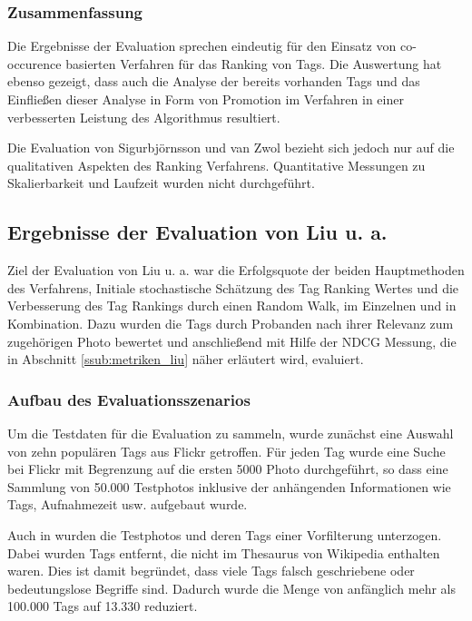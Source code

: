 
\subsubsection*{Zusammenfassung} %
\label{ssub:zusammenfassung}
Die Ergebnisse der Evaluation sprechen eindeutig für den Einsatz von co-occurence basierten Verfahren für das Ranking von Tags. Die Auswertung hat ebenso gezeigt, dass auch die Analyse der bereits vorhanden Tags und das Einfließen dieser Analyse in Form von Promotion im Verfahren in einer verbesserten Leistung des Algorithmus resultiert.

Die Evaluation von Sigurbjörnsson und van Zwol bezieht sich jedoch nur auf die qualitativen Aspekten des Ranking Verfahrens. Quantitative Messungen zu Skalierbarkeit und Laufzeit wurden nicht durchgeführt. 


\subsection{Ergebnisse der Evaluation von Liu u. a.} %
\label{sub:ergebnisse_der_evaluation_von_liu}

Ziel der Evaluation von Liu u. a. war die Erfolgsquote der beiden Hauptmethoden des Verfahrens, Initiale stochastische Schätzung des Tag Ranking Wertes und die Verbesserung des Tag Rankings durch einen Random Walk, im Einzelnen und in Kombination. Dazu wurden die Tags durch Probanden nach ihrer Relevanz zum zugehörigen Photo bewertet und anschließend mit Hilfe der NDCG Messung, die in Abschnitt \ref{ssub:metriken_liu} näher erläutert wird, evaluiert.

\subsubsection{Aufbau des Evaluationsszenarios} %
\label{ssub:aufbau_des_evaluationsszenarios_liu}
Um die Testdaten für die Evaluation zu sammeln, wurde zunächst eine Auswahl von zehn populären Tags aus Flickr getroffen. Für jeden Tag wurde eine Suche bei Flickr mit Begrenzung auf die ersten 5000 Photo durchgeführt, so dass eine Sammlung von 50.000 Testphotos inklusive der anhängenden Informationen wie Tags, Aufnahmezeit usw. aufgebaut wurde.

Auch in \cite{ranking} wurden die Testphotos und deren Tags einer Vorfilterung unterzogen. Dabei wurden Tags entfernt, die nicht im Thesaurus von Wikipedia enthalten waren. Dies ist damit begründet, dass viele Tags falsch geschriebene oder bedeutungslose Begriffe sind. Dadurch wurde die Menge von anfänglich mehr als 100.000 Tags auf 13.330 reduziert.

